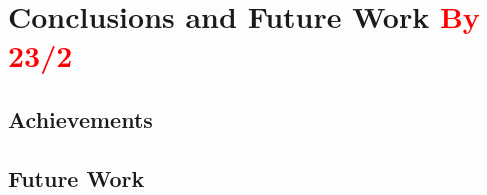 \chapter{Conclusions and Future Work \textcolor{red}{By 23/2}}
\label{chapter:conclusions}

\section{Achievements}
\label{sec:chp7-1_achievements}


\section{Future Work}
\label{sec:chp7-2_future_work}